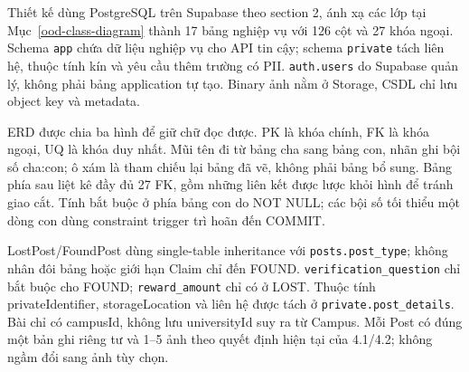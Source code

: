 Thiết kế dùng PostgreSQL trên Supabase theo section 2, ánh xạ các lớp tại Mục~\ref{ood-class-diagram} thành 17 bảng nghiệp vụ với 126 cột và 27 khóa ngoại. Schema \texttt{app} chứa dữ liệu nghiệp vụ cho API tin cậy; schema \texttt{private} tách liên hệ, thuộc tính kín và yêu cầu thêm trường có PII. \texttt{auth.users} do Supabase quản lý, không phải bảng application tự tạo. Binary ảnh nằm ở Storage, CSDL chỉ lưu object key và metadata.

ERD được chia ba hình để giữ chữ đọc được. PK là khóa chính, FK là khóa ngoại, UQ là khóa duy nhất. Mũi tên đi từ bảng cha sang bảng con, nhãn ghi bội số cha:con; ô xám là tham chiếu lại bảng đã vẽ, không phải bảng bổ sung. Bảng phía sau liệt kê đầy đủ 27 FK, gồm những liên kết được lược khỏi hình để tránh giao cắt. Tính bắt buộc ở phía bảng con do NOT NULL; các bội số tối thiểu một dòng con dùng constraint trigger trì hoãn đến COMMIT.



LostPost/FoundPost dùng single-table inheritance với \texttt{posts.post\_type}; không nhân đôi bảng hoặc giới hạn Claim chỉ đến FOUND. \texttt{verification\_question} chỉ bắt buộc cho FOUND; \texttt{reward\_amount} chỉ có ở LOST. Thuộc tính privateIdentifier, storageLocation và liên hệ được tách ở \texttt{private.post\_\allowbreak{}details}. Bài chỉ có campusId, không lưu universityId suy ra từ Campus. Mỗi Post có đúng một bản ghi riêng tư và 1--5 ảnh theo quyết định hiện tại của 4.1/4.2; không ngầm đổi sang ảnh tùy chọn.
